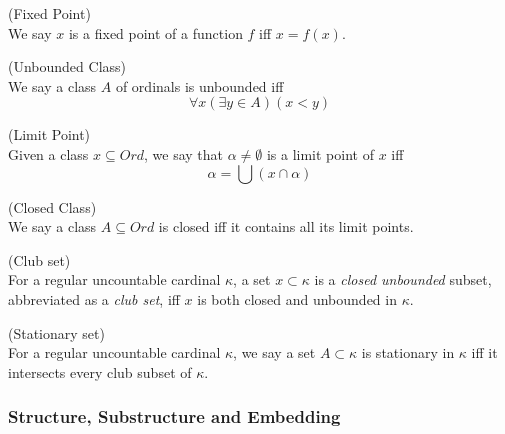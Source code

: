 \begin{definition}{(Fixed Point)}\label{def:fixed_point}\\
We say $x$ is a fixed point of a function $f$ iff $x=f(x)$.
\end{definition}

\begin{definition}{(Unbounded Class)}\label{def:unbounded_class}\\
We say a class $A$ of ordinals is unbounded iff
\begin{equation}
\forall x (\exists y \in A) (x < y)
\end{equation}
\end{definition}

\begin{definition}{(Limit Point)}\label{def:limit_point}\\
Given a class $x \subseteq Ord$, we say that $\alpha \neq \emptyset$ is a limit point of $x$ iff 
\begin{equation}
\alpha = \bigcup(x \cap \alpha)
\end{equation}
\end{definition}

\begin{definition}{(Closed Class)}\label{def:closed_class}\\
We say a class $A \subseteq Ord$ is closed iff it contains all its limit points.
\end{definition}

\begin{definition}{(Club set)}\label{def:club_set}\\
For a regular uncountable cardinal $\kappa$, a set $x \subset \kappa$ is a \emph{closed unbounded} subset, abbreviated as a \emph{club set}, iff $x$ is both closed and unbounded in $\kappa$.
\end{definition}

\begin{definition}{(Stationary set)}\label{def:stationary_set}\\
For a regular uncountable cardinal $\kappa$, we say a set $A \subset \kappa$ is stationary in $\kappa$ iff it intersects every club subset of $\kappa$.
\end{definition}

\subsubsection{Structure, Substructure and Embedding}

